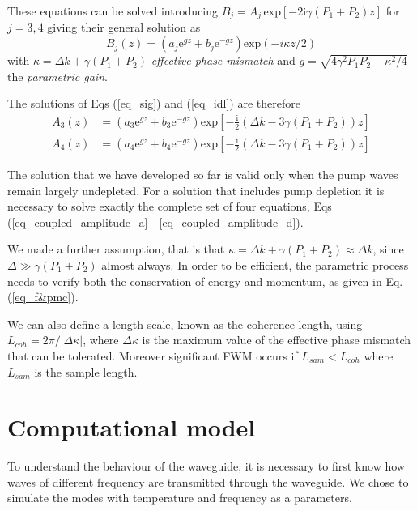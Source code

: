 \documentclass[12pt,a4paper,twoside]{article}
\begin{document}
These equations can be solved introducing $B_j = A_j \,\mathrm{exp}[-2\mathrm{i}\gamma(P_1+P_2)z]$ for $j=3,4$ giving their general solution as
\begin{equation*}
	B_j(z) = (a_j\mathrm{e}^{gz}+b_j\mathrm{e}^{-gz})\mathrm{exp}(-i\kappa z/2)
\end{equation*}
with $\kappa = \Delta k + \gamma(P_1 + P_2)$ \textit{effective phase mismatch} and $g = \sqrt{4\gamma^2P_1P_2 - \kappa^2/4}$ the \textit{parametric gain}.

The solutions of Eqs (\ref{eq_sig}) and (\ref{eq_idl}) are therefore
\begin{subequations}
\begin{align}
	A_3(z) &= \left(a_3\mathrm{e}^{gz}+b_3\mathrm{e}^{-gz}\right)\mathrm{exp}\left[-\frac{\mathrm{i}}{2}(\Delta k -3\gamma(P_1 + P_2))z\right]
		\label{eq_sig_sol} \\
	A_4(z) &= \left(a_4\mathrm{e}^{gz}+b_4\mathrm{e}^{-gz}\right)\mathrm{exp}\left[-\frac{\mathrm{i}}{2}(\Delta k -3\gamma(P_1 + P_2))z\right]	
		\label{eq_idl_sol}
\end{align}
\end{subequations}

The solution that we have developed so far is valid only when the pump waves remain largely undepleted.
For a solution that includes pump depletion it is necessary to solve exactly the complete set of four equations, Eqs (\ref{eq_coupled_amplitude_a} - \ref{eq_coupled_amplitude_d}).

We made a further assumption, that is that $\kappa = \Delta k + \gamma(P_1 + P_2) \approx \Delta k$, since $\Delta \gg \gamma(P_1 + P_2)$ almost always.
In order to be efficient, the parametric process needs to verify both the conservation of energy and momentum, as given in Eq. (\ref{eq_f&pmc}).

We can also define a length scale, known as the coherence length, using $L_{coh} = 2\pi/|\Delta\kappa|$, where $\Delta\kappa$ is the maximum value of the effective phase mismatch that can be tolerated.
Moreover significant FWM occurs if $L_{sam}<L_{coh}$ where $L_{sam}$ is the sample length.

\section{Computational model}
To understand the behaviour of the waveguide, it is necessary to first know how waves of different frequency are transmitted through the waveguide.
We chose to simulate the modes with temperature and frequency as a parameters.
\end{document}
